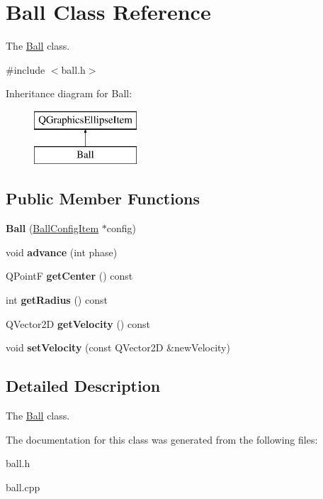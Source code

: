 \hypertarget{classBall}{\section{Ball Class Reference}
\label{classBall}
}


The \hyperlink{classBall}{Ball} class.  




{\ttfamily \#include $<$ball.\-h$>$}

Inheritance diagram for Ball\-:\begin{figure}[H]
\begin{center}
\leavevmode
\includegraphics[height=2.000000cm]{classBall}
\end{center}
\end{figure}
\subsection*{Public Member Functions}
\begin{DoxyCompactItemize}
\item 
\hypertarget{classBall_aa7fd02a53e4a659af542ae0a43347eb0}{{\bfseries Ball} (\hyperlink{classBallConfigItem}{Ball\-Config\-Item} $\ast$config)}\label{classBall_aa7fd02a53e4a659af542ae0a43347eb0}

\item 
\hypertarget{classBall_adc25aa6b771ad0bf296d10db4ebcd158}{void {\bfseries advance} (int phase)}\label{classBall_adc25aa6b771ad0bf296d10db4ebcd158}

\item 
\hypertarget{classBall_ac98f05d69458a27ba3b98edb07c3a2fa}{Q\-Point\-F {\bfseries get\-Center} () const }\label{classBall_ac98f05d69458a27ba3b98edb07c3a2fa}

\item 
\hypertarget{classBall_a7932545632a5c6faea61336d707a9c5b}{int {\bfseries get\-Radius} () const }\label{classBall_a7932545632a5c6faea61336d707a9c5b}

\item 
\hypertarget{classBall_a4f69330e1f4f6a554cfc9e4cba091440}{Q\-Vector2\-D {\bfseries get\-Velocity} () const }\label{classBall_a4f69330e1f4f6a554cfc9e4cba091440}

\item 
\hypertarget{classBall_aaa7ecfb934f2ace670bdf81eb0bf712e}{void {\bfseries set\-Velocity} (const Q\-Vector2\-D \&new\-Velocity)}\label{classBall_aaa7ecfb934f2ace670bdf81eb0bf712e}

\end{DoxyCompactItemize}


\subsection{Detailed Description}
The \hyperlink{classBall}{Ball} class. 

The documentation for this class was generated from the following files\-:\begin{DoxyCompactItemize}
\item 
ball.\-h\item 
ball.\-cpp\end{DoxyCompactItemize}

